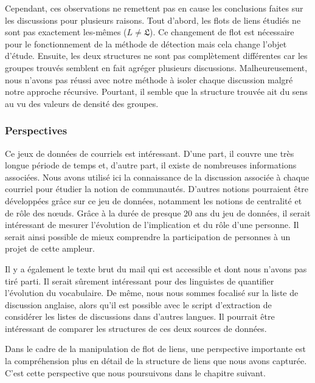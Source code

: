 Cependant, ces observations ne remettent pas en cause les conclusions faites sur les discussions pour plusieurs raisons.
Tout d'abord, les flots de liens étudiés ne sont pas exactement les-mêmes ($L\neq \mathfrak{L}$).
Ce changement de flot est nécessaire pour le fonctionnement de la méthode de détection mais cela change l'objet d'étude.
Ensuite, les deux structures ne sont pas complètement différentes car les groupes trouvés semblent en fait agréger plusieurs discussions.
Malheureusement, nous n'avons pas réussi avec notre méthode à isoler chaque discussion malgré notre approche récursive.
Pourtant, il semble que la structure trouvée ait du sens au vu des valeurs de densité des groupes.

\subsubsection{Perspectives}

Ce jeux de données de courriels est intéressant.
D'une part, il couvre une très longue période de temps et, d'autre part, il existe de nombreuses informations associées.
Nous avons utilisé ici la connaissance de la discussion associée à chaque courriel pour étudier la notion de communautés.
D'autres notions pourraient être développées grâce sur ce jeu de données, notamment les notions de centralité et de rôle des n\oe{}uds.
Grâce à la durée de presque $20$ ans du jeu de données, il serait intéressant de mesurer l'évolution de l'implication et du rôle d'une personne.
Il serait ainsi possible de mieux comprendre la participation de personnes à un projet de cette ampleur.

Il y a également le texte brut du mail qui est accessible et dont nous n'avons pas tiré parti.
Il serait sûrement intéressant pour des linguistes de quantifier l'évolution du vocabulaire.
De même, nous nous sommes focalisé sur la liste de discussion anglaise, alors qu'il est possible avec le script d'extraction de considérer les listes de discussions dans d'autres langues.
Il pourrait être intéressant de comparer les structures de ces deux sources de données.

\bigskip

Dans le cadre de la manipulation de flot de liens, une perspective importante est la compréhension plus en détail de la structure de liens que nous avons capturée.
C'est cette perspective que nous poursuivons dans le chapitre suivant.

